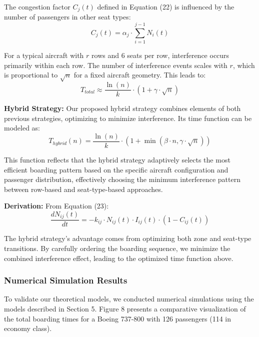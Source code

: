 The congestion factor $C_j(t)$ defined in Equation (22) is influenced by the number of passengers in other seat types:
\begin{equation}
C_j(t) = \alpha_j \cdot \sum_{i=1}^{j-1} N_i(t)
\end{equation}

For a typical aircraft with $r$ rows and 6 seats per row, interference occurs primarily within each row. The number of interference events scales with $r$, which is proportional to $\sqrt{n}$ for a fixed aircraft geometry. This leads to:
\begin{equation}
T_{total} \approx \frac{\ln(n)}{k} \cdot (1 + \gamma \cdot \sqrt{n})
\end{equation}

\textbf{Hybrid Strategy:}
Our proposed hybrid strategy combines elements of both previous strategies, optimizing to minimize interference. Its time function can be modeled as:
\begin{equation}
T_{hybrid}(n) = \frac{\ln(n)}{k} \cdot (1 + \min(\beta \cdot n, \gamma \cdot \sqrt{n}))
\end{equation}

This function reflects that the hybrid strategy adaptively selects the most efficient boarding pattern based on the specific aircraft configuration and passenger distribution, effectively choosing the minimum interference pattern between row-based and seat-type-based approaches.

\textbf{Derivation:} From Equation (23):
\begin{equation}
\frac{dN_{ij}(t)}{dt} = -k_{ij} \cdot N_{ij}(t) \cdot I_{ij}(t) \cdot (1 - C_{ij}(t))
\end{equation}

The hybrid strategy's advantage comes from optimizing both zone and seat-type transitions. By carefully ordering the boarding sequence, we minimize the combined interference effect, leading to the optimized time function above.

\subsubsection{Numerical Simulation Results}

To validate our theoretical models, we conducted numerical simulations using the models described in Section 5. Figure 8 presents a comparative visualization of the total boarding times for a Boeing 737-800 with 126 passengers (114 in economy class).

